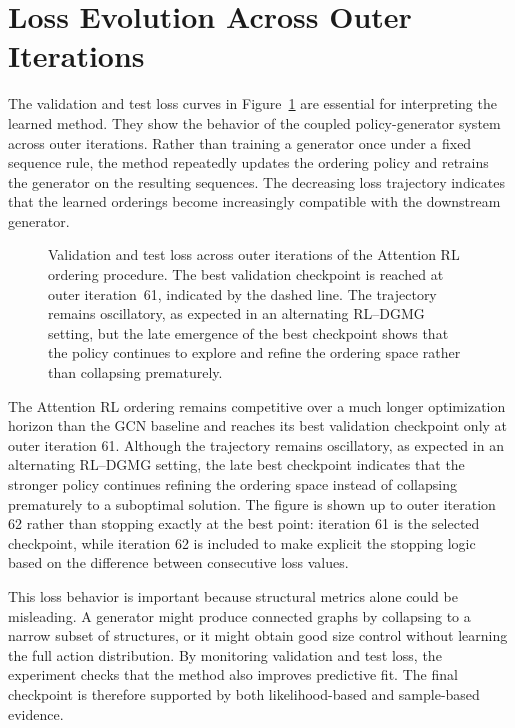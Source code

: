 \section{Loss Evolution Across Outer Iterations}
\label{sec:results-loss-evolution}

The validation and test loss curves in Figure~\ref{fig:ba-nll-evolution-loops} are essential for interpreting the learned method. They show the behavior of the coupled policy-generator system across outer iterations. Rather than training a generator once under a fixed sequence rule, the method repeatedly updates the ordering policy and retrains the generator on the resulting sequences. The decreasing loss trajectory indicates that the learned orderings become increasingly compatible with the downstream generator.

\begin{figure}[H]
    \centering
    \caption{Validation and test loss across outer iterations of the Attention RL ordering procedure. The best validation checkpoint is reached at outer iteration~61, indicated by the dashed line. The trajectory remains oscillatory, as expected in an alternating RL--DGMG setting, but the late emergence of the best checkpoint shows that the policy continues to explore and refine the ordering space rather than collapsing prematurely.}
    \label{fig:ba-nll-evolution-loops}
\end{figure}

The Attention RL ordering remains competitive over a much longer optimization horizon than the GCN baseline and reaches its best validation checkpoint only at outer iteration 61. Although the trajectory remains oscillatory, as expected in an alternating RL--DGMG setting, the late best checkpoint indicates that the stronger policy continues refining the ordering space instead of collapsing prematurely to a suboptimal solution. The figure is shown up to outer iteration 62 rather than stopping exactly at the best point: iteration 61 is the selected checkpoint, while iteration 62 is included to make explicit the stopping logic based on the difference between consecutive loss values.

This loss behavior is important because structural metrics alone could be misleading. A generator might produce connected graphs by collapsing to a narrow subset of structures, or it might obtain good size control without learning the full action distribution. By monitoring validation and test loss, the experiment checks that the method also improves predictive fit. The final checkpoint is therefore supported by both likelihood-based and sample-based evidence.

